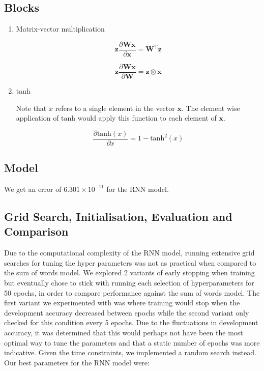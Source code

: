 \documentclass{article} %
\begin{document}
\subsection{Blocks}

\begin{enumerate}

\item Matrix-vector multiplication

\[\mathbf{z} \frac{\partial \mathbf{W} \mathbf{x}}{\partial \mathbf{x}}  = \mathbf{W}^{\text{T}} \mathbf{z}\]

\[\mathbf{z} \frac{\partial \mathbf{W} \mathbf{x}}{\partial \mathbf{W}}  = \mathbf{z} \otimes \mathbf{x}\]

\item tanh

Note that $x$ refers to a single element in the vector $\mathbf{x}$. The element wise application of $\text{tanh}$ would apply this function to each element of $\mathbf{x}$.

\[ \frac{\partial \text{tanh}(x)}{\partial x} = 1 - \text{tanh}^2(x) \]

\end{enumerate}

\subsection{Model}

We get an error of $6.301 \times 10^{-11}$ for the RNN model.

\subsection{Grid Search, Initialisation, Evaluation and Comparison}

Due to the computational complexity of the RNN model, running extensive grid searches for tuning the hyper parameters was not as practical when compared to the sum of words model. We explored 2 variants of early stopping when training but eventually chose to stick with running each selection of hyperparameters for 50 epochs, in order to compare performance against the sum of words model. The first variant we experimented with was where training would stop when the development accuracy decreased between epochs while the second variant only checked for this condition every 5 epochs. Due to the fluctuations in development accuracy, it was determined that this would perhaps not have been the most optimal way to tune the parameters and that a static number of epochs was more indicative. Given the time constraints, we implemented a random search instead. Our best parameters for the RNN model were:
\end{document}
